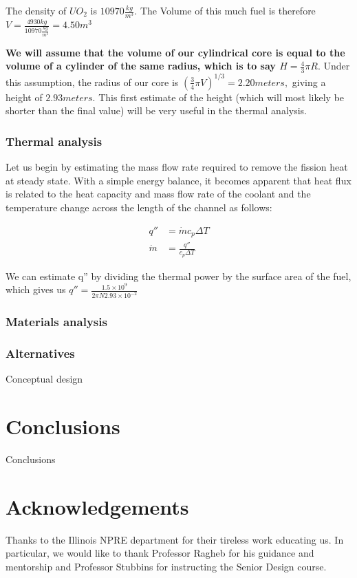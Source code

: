 \documentclass[12pt]{article}
\begin{document}
The density of $UO_2$ is $10970 \frac{kg}{m^3}$. The Volume of this much fuel is therefore $V = \frac{4930 kg}{10970 \frac{kg}{m^3}} =  4.50 m ^ 3 $

\textbf{We will assume that the volume of our cylindrical core is equal to the volume of a cylinder of the same radius, which is to say $H = \frac{4}{3} \pi R$}. Under this assumption, the radius of our core is $(\frac{3}{4} \pi V) ^ {1/3} = 2.20 meters,$ giving a height of $2.93 meters$. This first estimate of the height (which will most likely be shorter than the final value) will be very useful in the thermal analysis.   
\subsubsection{Thermal analysis}
Let us begin by estimating the mass flow rate required to remove the fission heat at steady state. With a simple energy balance, it becomes apparent that heat flux is related to the heat capacity and mass flow rate of the coolant and the temperature change across the length of the channel as follows:

\begin{align}
q'' &= \dot{m} c_p \Delta T \\
\dot{m} &= \frac{q''}{c_p \Delta T}
\end{align}

We can estimate q'' by dividing the thermal power by the surface area of the fuel, which gives us $q'' = \frac{1.5 \times 10^9}{2 \pi N 2.93 \times 10 ^{-2}}$

\subsubsection{Materials analysis}
\subsubsection{Alternatives}
Conceptual design
\section{Conclusions}
Conclusions


\section{Acknowledgements}
Thanks to the Illinois NPRE department for their tireless work educating us. In particular, we would like to thank Professor Ragheb for his guidance and mentorship and Professor Stubbins for instructing the Senior Design course.



\end{document}
